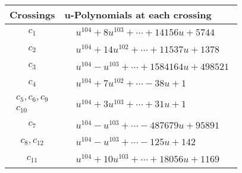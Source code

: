 \documentclass[1p]{elsarticle_modified}
\theoremstyle{definition}
\begin{document}
\begin{tabular}{m{50pt}|m{274pt}}
Crossings & \hspace{64pt}u-Polynomials at each crossing \\
\hline $$\begin{aligned}c_{1}\end{aligned}$$&$\begin{aligned}
&u^{104}+8 u^{103}+\cdots+14156 u+5744
\end{aligned}$\\
\hline $$\begin{aligned}c_{2}\end{aligned}$$&$\begin{aligned}
&u^{104}+14 u^{102}+\cdots+11537 u+1378
\end{aligned}$\\
\hline $$\begin{aligned}c_{3}\end{aligned}$$&$\begin{aligned}
&u^{104}- u^{103}+\cdots+1584164 u+498521
\end{aligned}$\\
\hline $$\begin{aligned}c_{4}\end{aligned}$$&$\begin{aligned}
&u^{104}+7 u^{102}+\cdots-38 u+1
\end{aligned}$\\
\hline $$\begin{aligned}c_{5},c_{6},c_{9}\\c_{10}\end{aligned}$$&$\begin{aligned}
&u^{104}+3 u^{103}+\cdots+31 u+1
\end{aligned}$\\
\hline $$\begin{aligned}c_{7}\end{aligned}$$&$\begin{aligned}
&u^{104}- u^{103}+\cdots-487679 u+95891
\end{aligned}$\\
\hline $$\begin{aligned}c_{8},c_{12}\end{aligned}$$&$\begin{aligned}
&u^{104}- u^{103}+\cdots-125 u+142
\end{aligned}$\\
\hline $$\begin{aligned}c_{11}\end{aligned}$$&$\begin{aligned}
&u^{104}+10 u^{103}+\cdots+18056 u+1169
\end{aligned}$\\
\hline
\end{tabular}\\~\\
\end{document}
